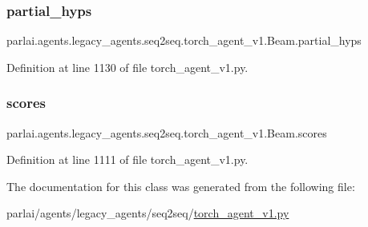 \subsubsection{\texorpdfstring{partial\+\_\+hyps}{partial\_hyps}}
{\footnotesize\ttfamily parlai.\+agents.\+legacy\+\_\+agents.\+seq2seq.\+torch\+\_\+agent\+\_\+v1.\+Beam.\+partial\+\_\+hyps}



Definition at line 1130 of file torch\+\_\+agent\+\_\+v1.\+py.

\mbox{\label{classparlai_1_1agents_1_1legacy__agents_1_1seq2seq_1_1torch__agent__v1_1_1Beam_ad7e21da35d537a09f23973b415e62660}} 
\subsubsection{\texorpdfstring{scores}{scores}}
{\footnotesize\ttfamily parlai.\+agents.\+legacy\+\_\+agents.\+seq2seq.\+torch\+\_\+agent\+\_\+v1.\+Beam.\+scores}



Definition at line 1111 of file torch\+\_\+agent\+\_\+v1.\+py.



The documentation for this class was generated from the following file\+:\begin{DoxyCompactItemize}
\item 
parlai/agents/legacy\+\_\+agents/seq2seq/\hyperlink{torch__agent__v1_8py}{torch\+\_\+agent\+\_\+v1.\+py}\end{DoxyCompactItemize}

